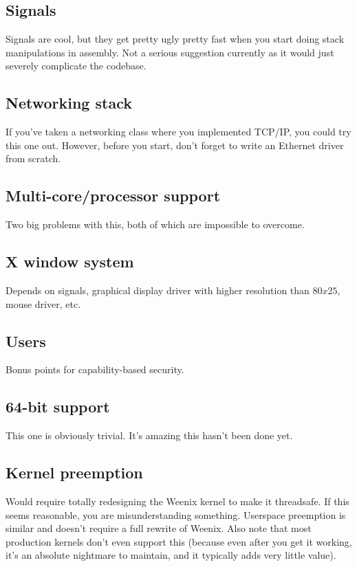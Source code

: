 \subsection{Signals}
Signals are cool, but they get pretty ugly pretty fast when you start doing stack manipulations in assembly. Not a serious suggestion currently as it would just severely complicate the codebase.
\subsection{Networking stack}
If you've taken a networking class where you implemented TCP/IP, you could try this one out. However, before you start, don't forget to write an Ethernet driver from scratch.
\subsection{Multi-core/processor support}
Two big problems with this, both of which are impossible to overcome.
\subsection{X window system}
Depends on signals, graphical display driver with higher resolution than $80x25$, mouse driver, etc.
\subsection{Users}
Bonus points for capability-based security.
\subsection{64-bit support}
This one is obviously trivial. It's amazing this hasn't been done yet.
\subsection{Kernel preemption}
Would require totally redesigning the Weenix kernel to make it threadsafe. If this seems reasonable, you are misunderstanding something. Userspace preemption is similar and doesn't require a full rewrite of Weenix. Also note that most production kernels don't even support this (because even after you get it working, it's an absolute nightmare to maintain, and it typically adds very little value). %
 
